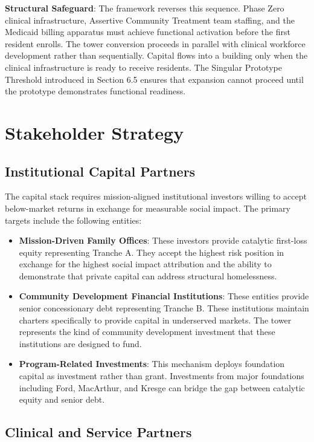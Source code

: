 \documentclass[12pt, letterpaper]{article}
\begin{document}
\textbf{Structural Safeguard}: The framework reverses this sequence. Phase Zero clinical infrastructure, Assertive Community Treatment team staffing, and the Medicaid billing apparatus must achieve functional activation before the first resident enrolls. The tower conversion proceeds in parallel with clinical workforce development rather than sequentially. Capital flows into a building only when the clinical infrastructure is ready to receive residents. The Singular Prototype Threshold introduced in Section 6.5 ensures that expansion cannot proceed until the prototype demonstrates functional readiness.

\newpage
\section{Stakeholder Strategy}

\subsection{Institutional Capital Partners}

The capital stack requires mission-aligned institutional investors willing to accept below-market returns in exchange for measurable social impact. The primary targets include the following entities:

\begin{itemize}
    \item \textbf{Mission-Driven Family Offices}: These investors provide catalytic first-loss equity representing Tranche A. They accept the highest risk position in exchange for the highest social impact attribution and the ability to demonstrate that private capital can address structural homelessness.
    \item \textbf{Community Development Financial Institutions}: These entities provide senior concessionary debt representing Tranche B. These institutions maintain charters specifically to provide capital in underserved markets. The tower represents the kind of community development investment that these institutions are designed to fund.
    \item \textbf{Program-Related Investments}: This mechanism deploys foundation capital as investment rather than grant. Investments from major foundations including Ford, MacArthur, and Kresge can bridge the gap between catalytic equity and senior debt.
\end{itemize}

\subsection{Clinical and Service Partners}
\end{document}
